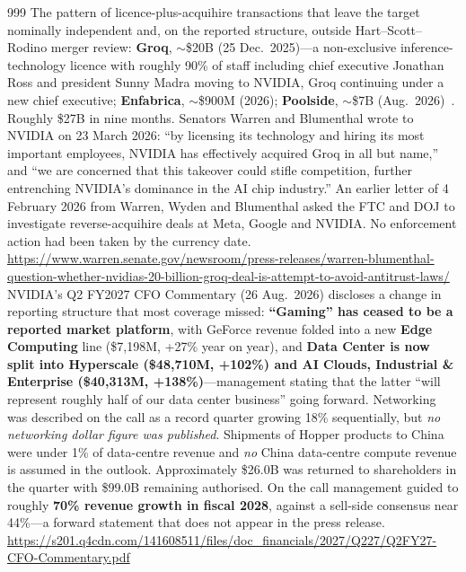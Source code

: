 \begin{thebibliography}{999}
 The pattern of licence-plus-acquihire transactions that leave the target nominally independent and, on the reported structure, outside Hart--Scott--Rodino merger review: \textbf{Groq}, $\sim$\$20B (25 Dec.\ 2025)---a non-exclusive inference-technology licence with roughly 90\% of staff including chief executive Jonathan Ross and president Sunny Madra moving to NVIDIA, Groq continuing under a new chief executive; \textbf{Enfabrica}, $\sim$\$900M (2026); \textbf{Poolside}, $\sim$\$7B (Aug.\ 2026)~\cite{nvda-poolside}. Roughly \$27B in nine months. Senators Warren and Blumenthal wrote to NVIDIA on 23 March 2026: ``by licensing its technology and hiring its most important employees, NVIDIA has effectively acquired Groq in all but name,'' and ``we are concerned that this takeover could stifle competition, further entrenching NVIDIA's dominance in the AI chip industry.'' An earlier letter of 4 February 2026 from Warren, Wyden and Blumenthal asked the FTC and DOJ to investigate reverse-acquihire deals at Meta, Google and NVIDIA. No enforcement action had been taken by the currency date. \url{https://www.warren.senate.gov/newsroom/press-releases/warren-blumenthal-question-whether-nvidias-20-billion-groq-deal-is-attempt-to-avoid-antitrust-laws/}
 NVIDIA's Q2 FY2027 CFO Commentary (26 Aug.\ 2026) discloses a change in reporting structure that most coverage missed: \textbf{``Gaming'' has ceased to be a reported market platform}, with GeForce revenue folded into a new \textbf{Edge Computing} line (\$7{,}198M, +27\% year on year), and \textbf{Data Center is now split into Hyperscale (\$48{,}710M, +102\%) and AI Clouds, Industrial \& Enterprise (\$40{,}313M, +138\%)}---management stating that the latter ``will represent roughly half of our data center business'' going forward. Networking was described on the call as a record quarter growing 18\% sequentially, but \emph{no networking dollar figure was published}. Shipments of Hopper products to China were under 1\% of data-centre revenue and \emph{no} China data-centre compute revenue is assumed in the outlook. Approximately \$26.0B was returned to shareholders in the quarter with \$99.0B remaining authorised. On the call management guided to roughly \textbf{70\% revenue growth in fiscal 2028}, against a sell-side consensus near 44\%---a forward statement that does not appear in the press release. \url{https://s201.q4cdn.com/141608511/files/doc_financials/2027/Q227/Q2FY27-CFO-Commentary.pdf}

\end{thebibliography}
